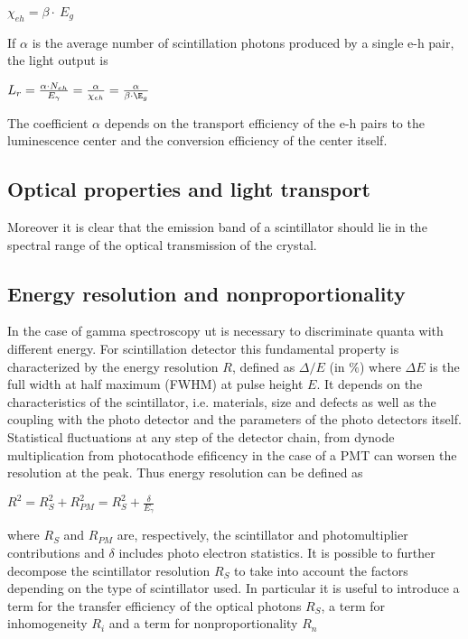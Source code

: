 $\chi _{eh} = \beta \cdot \ E_{g}$

If $\alpha$ is the average number of scintillation photons produced by a single e-h pair, the light output is

$L_{r} = \frac{\alpha \cdot N_{eh}}{E_{\gamma}} = \frac{\alpha}{\chi _{eh}} = \frac{\alpha}{\beta \cdot \E_{g}}$

The coefficient $\alpha$ depends on the transport efficiency of the e-h pairs to the luminescence center and the conversion efficiency of the center itself.

\subsection{Optical properties and light transport}
Moreover it is clear that the emission band of a scintillator should lie in the spectral range of the optical transmission of the crystal.

\subsection{Energy resolution and nonproportionality}
In the case of gamma spectroscopy ut is necessary to discriminate quanta with different energy.
For scintillation detector this fundamental property is characterized by the energy resolution $R$, defined as $\Delta /E$ (in $\%$) where $\Delta E$ is the full width at half maximum (FWHM) at pulse height $E$.
It depends on the characteristics of the scintillator, i.e. materials, size and defects as well as the coupling with the photo detector and the parameters of the photo detectors itself. Statistical fluctuations at any step of the detector chain, from dynode multiplication from photocathode efificency in the case of a PMT can worsen the resolution at the peak. Thus energy resolution can be defined as\cite{Rodnyi1997}

$R^{2} = R_{S}^{2} + R_{PM}^{2} = R_{S}^{2} + \frac{\delta}{E_{\gamma}}$

where $R_{S}$ and $R_{PM}$ are, respectively, the scintillator and photomultiplier contributions and $\delta$ includes photo electron statistics.
It is possible to further decompose the scintillator resolution $R_{S}$ to take into account the factors depending on the type of scintillator used. In particular it is useful to introduce a term for the transfer efficiency of the optical photons $R_{S}$, a term for inhomogeneity $R_{i}$ and a term for nonproportionality $R_{n}$

